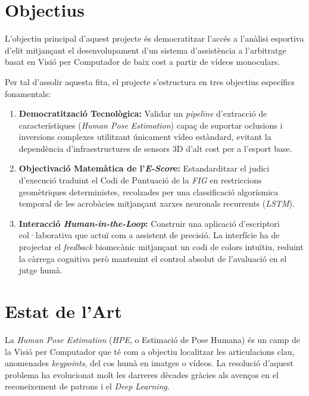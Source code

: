 \documentclass[10pt,a4paper,twocolumn,twoside]{article}
\begin{document}
\section{Objectius}

L'objectiu principal d'aquest projecte és democratitzar l'accés a l'anàlisi esportiva d'elit mitjançant el desenvolupament d'un sistema d'assistència a l'arbitratge basat en Visió per Computador de baix cost a partir de vídeos monoculars. 

Per tal d'assolir aquesta fita, el projecte s'estructura en tres objectius específics fonamentals:

\begin{enumerate}
    \item \textbf{Democratització Tecnològica:} Validar un \textit{pipeline} d'extracció de característiques (\textit{Human Pose Estimation}) capaç de suportar oclusions i inversions complexes utilitzant únicament vídeo estàndard, evitant la dependència d'infraestructures de sensors 3D d'alt cost per a l'esport base.

    \item \textbf{Objectivació Matemàtica de l'\textit{E-Scor}e:} Estandarditzar el judici d'execució traduint el Codi de Puntuació de la \textit{FIG} \cite{fig_rules} en restriccions geomètriques deterministes, recolzades per una classificació algorísmica temporal de les acrobàcies mitjançant xarxes neuronals recurrents (\textit{LSTM}).

    \item \textbf{Interacció \textit{Human-in-the-Loop}:} Construir una aplicació d'escriptori col·laborativa que actuï com a assistent de precisió. La interfície ha de projectar el \textit{feedback} biomecànic mitjançant un codi de colors intuïtiu, reduint la càrrega cognitiva però mantenint el control absolut de l'avaluació en el jutge humà.
\end{enumerate}

\section{Estat de l'Art}

La \textit{Human Pose Estimation} (\textit{HPE}, o Estimació de Pose Humana) és un camp de la Visió per Computador que té com a objectiu localitzar les articulacions clau, anomenades \textit{keypoints}, del cos humà en imatges o vídeos. La resolució d'aquest problema ha evolucionat molt les darreres dècades gràcies als avenços en el reconeixement de patrons i el \textit{Deep Learning}.
\end{document}
